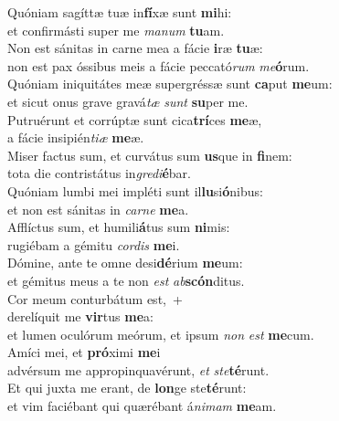 \evenverse Quóniam sagíttæ tuæ in\textbf{fí}xæ sunt \textbf{mi}hi:~\*\\
\evenverse et confirmásti super me \textit{ma}\textit{num} \textbf{tu}am.\\
\oddverse Non est sánitas in carne mea a fácie \textbf{i}ræ \textbf{tu}æ:~\*\\
\oddverse non est pax óssibus meis a fácie peccató\textit{rum} \textit{me}\textbf{ó}rum.\\
\evenverse Quóniam iniquitátes meæ supergréssæ sunt \textbf{ca}put \textbf{me}um:~\*\\
\evenverse et sicut onus grave gravá\textit{tæ} \textit{sunt} \textbf{su}per me.\\
\oddverse Putruérunt et corrúptæ sunt cica\textbf{trí}ces \textbf{me}æ,~\*\\
\oddverse a fácie insipién\textit{ti}\textit{æ} \textbf{me}æ.\\
\evenverse Miser factus sum, et curvátus sum \textbf{us}que in \textbf{fi}nem:~\*\\
\evenverse tota die contristátus in\textit{gre}\textit{di}\textbf{é}bar.\\
\oddverse Quóniam lumbi mei impléti sunt il\textbf{lu}si\textbf{ó}nibus:~\*\\
\oddverse et non est sánitas in \textit{car}\textit{ne} \textbf{me}a.\\
\evenverse Afflíctus sum, et humili\textbf{á}tus sum \textbf{ni}mis:~\*\\
\evenverse rugiébam a gémitu \textit{cor}\textit{dis} \textbf{me}i.\\
\oddverse Dómine, ante te omne desi\textbf{dé}rium \textbf{me}um:~\*\\
\oddverse et gémitus meus a te non \textit{est} \textit{ab}\textbf{scón}ditus.\\
\evenverse Cor meum conturbátum est,~+\\
\evenverse  derelíquit me \textbf{vir}tus \textbf{me}a:~\*\\
\evenverse et lumen oculórum meórum, et ipsum \textit{non} \textit{est} \textbf{me}cum.\\
\oddverse Amíci mei, et \textbf{pró}ximi \textbf{me}i~\*\\
\oddverse advérsum me appropinquavérunt, \textit{et} \textit{ste}\textbf{té}runt.\\
\evenverse Et qui juxta me erant, de \textbf{lon}ge ste\textbf{té}runt:~\*\\
\evenverse et vim faciébant qui quærébant á\textit{ni}\textit{mam} \textbf{me}am.\\
